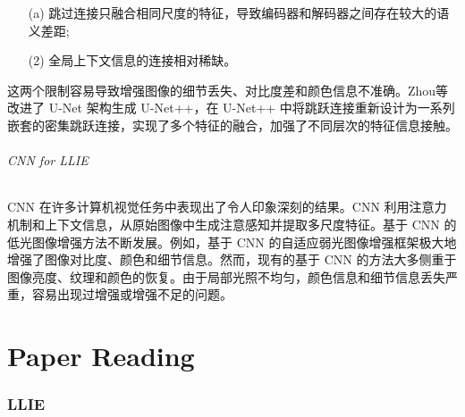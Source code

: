 \documentclass[a4paper]{ctexart}
\begin{document}
	\begin{itemize}
		\item[(a)] 
		跳过连接只融合相同尺度的特征，导致编码器和解码器之间存在较大的语义差距;
		
		\item[(2)]
		全局上下文信息的连接相对稀缺。
	\end{itemize}	
	
	这两个限制容易导致增强图像的细节丢失、对比度差和颜色信息不准确。Zhou等\cite{zhou2018unet++,zhou2019unet++}改进了 U-Net 架构生成 U-Net++，在 U-Net++ 中将跳跃连接重新设计为一系列嵌套的密集跳跃连接，实现了多个特征的融合，加强了不同层次的特征信息接触。
	
	\paragraph{CNN for LLIE}
	
	CNN 在许多计算机视觉任务中表现出了令人印象深刻的结果。CNN 利用注意力机制\cite{yang2021locally, zhang2020attention}和上下文信息，从原始图像中生成注意感知并提取多尺度特征\cite{li2018multi,zamir2020learning}。基于 CNN 的低光图像增强方法不断发展。例如，基于 CNN 的自适应弱光图像增强框架\cite{li2020visual}极大地增强了图像对比度、颜色和细节信息。然而，现有的基于 CNN 的方法大多侧重于图像亮度、纹理和颜色的恢复\cite{xu2020learning}。由于局部光照不均匀，颜色信息和细节信息丢失严重，容易出现过增强或增强不足的问题。
	
	
	
	\part{Paper Reading}
	
	\section{LLIE}
	
\end{document}

